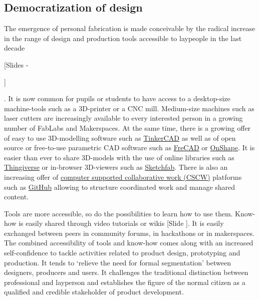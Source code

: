 \documentclass{article}
\newcounter{slide}
\begin{document}
\subsection{Democratization of design}
\label{sec:democratizationofdesign}
The emergence of personal fabrication is made conceivable by the radical increase in the range of design and production tools accessible to laypeople in the last decade {\color{blue}[Slides -\addtocounter{slide}{5}]}. It is now common for pupils or students to have access to a desktop-size machine-tools such as a 3D-printer or a CNC mill. Medium-size machines such as laser cutters are increasingly available to every interested person in a growing number of FabLabs and Makerspaces. At the same time, there is a growing offer of easy to use 3D-modelling software such as \href{https://www.tinkercad.com/}{TinkerCAD} as well as of open source or free-to-use parametric CAD software such as \href{https://www.freecadweb.org/}{FreCAD} or \href{https://www.onshape.com/}{OnShape}. It is easier than ever to share 3D-models with the use of online libraries such as \href{https://www.thingiverse.com/}{Thingiverse} or in-browser 3D-viewers such as \href{https://sketchfab.com/}{Sketchfab}. There is also an increasing offer of \href{https://en.wikipedia.org/wiki/Computer-supported_cooperative_work}{computer supported collaborative work (CSCW)} platforms such as \href{https://github.com/}{GitHub} allowing to structure coordinated work and manage shared content. 

Tools are more accessible, so do the possibilities to learn how to use them. Know-how is easily shared through video tutorials or wikis {\color{blue}[Slide ]}. It is easily exchanged between peers in community forums, in hackathons or in makerspaces. The combined accessibility of tools and know-how comes along with an increased self-confidence to tackle activities related to product design, prototyping and production. It tends to `relieve the need for formal segmentation' \cite{chenDirectDigitalManufacturing2015a} between designers, producers and users. It challenges the traditional distinction between professional and layperson and establishes the figure of the normal citizen as a qualified and credible stakeholder of product development.
\end{document}
